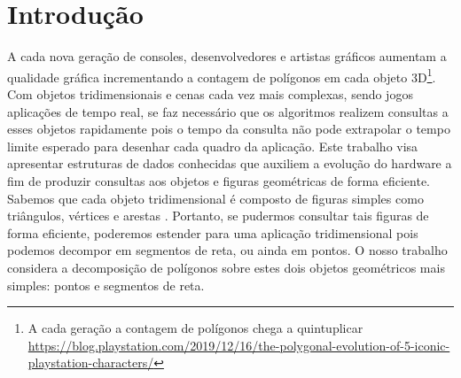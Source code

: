 \chapter{Introdução}\label{cap:intro}

A cada nova geração de consoles, desenvolvedores e artistas gráficos aumentam a  qualidade gráfica incrementando a contagem de polígonos em cada objeto 3D\footnote{A cada geração a contagem de polígonos chega a quintuplicar \url{https://blog.playstation.com/2019/12/16/the-polygonal-evolution-of-5-iconic-playstation-characters/}}. Com objetos tridimensionais e cenas cada vez mais complexas, sendo jogos aplicações de tempo real, se faz necessário que os algoritmos realizem consultas a esses objetos rapidamente pois o tempo da consulta não pode extrapolar o tempo limite esperado para desenhar cada quadro da aplicação.
Este trabalho visa apresentar estruturas de dados conhecidas que auxiliem a evolução do hardware a fim de produzir consultas aos objetos e figuras geométricas de forma eficiente. Sabemos que cada objeto tridimensional é composto de figuras simples como triângulos, vértices e arestas \cite{opengl}. Portanto, se pudermos consultar tais figuras de forma eficiente, poderemos estender para uma aplicação tridimensional pois podemos decompor em segmentos de reta, ou ainda em pontos. O nosso trabalho considera a decomposição de polígonos sobre estes dois objetos geométricos mais simples: pontos e segmentos de reta.

